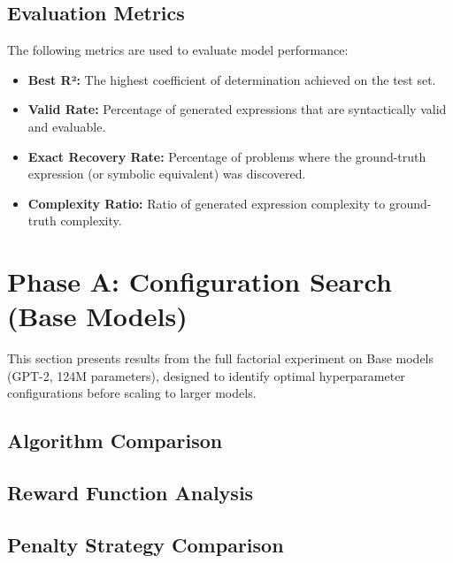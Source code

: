 \subsection{Evaluation Metrics}

The following metrics are used to evaluate model performance:

\begin{itemize}
    \item \textbf{Best R²:} The highest coefficient of determination achieved on the test set.
    \item \textbf{Valid Rate:} Percentage of generated expressions that are syntactically valid and evaluable.
    \item \textbf{Exact Recovery Rate:} Percentage of problems where the ground-truth expression (or symbolic equivalent) was discovered.
    \item \textbf{Complexity Ratio:} Ratio of generated expression complexity to ground-truth complexity.
\end{itemize}

\section{Phase A: Configuration Search (Base Models)}

This section presents results from the full factorial experiment on Base models (GPT-2, 124M parameters), designed to identify optimal hyperparameter configurations before scaling to larger models.

\subsection{Algorithm Comparison}

\subsection{Reward Function Analysis}

\subsection{Penalty Strategy Comparison}

